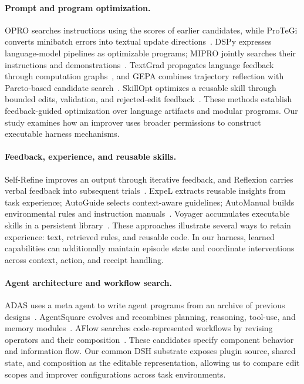 \documentclass[letterpaper]{article}
\begin{document}
\paragraph{Prompt and program optimization.}
OPRO searches instructions using the scores of earlier candidates, while ProTeGi converts minibatch errors into textual update directions~\citep{opro,protegi}. DSPy expresses language-model pipelines as optimizable programs; MIPRO jointly searches their instructions and demonstrations~\citep{dspy,mipro}. TextGrad propagates language feedback through computation graphs~\citep{textgrad}, and GEPA combines trajectory reflection with Pareto-based candidate search~\citep{gepa}. SkillOpt optimizes a reusable skill through bounded edits, validation, and rejected-edit feedback~\citep{skillopt}. These methods establish feedback-guided optimization over language artifacts and modular programs. Our study examines how an improver uses broader permissions to construct executable harness mechanisms.

\paragraph{Feedback, experience, and reusable skills.}
Self-Refine improves an output through iterative feedback, and Reflexion carries verbal feedback into subsequent trials~\citep{selfrefine,reflexion}. ExpeL extracts reusable insights from task experience; AutoGuide selects context-aware guidelines; AutoManual builds environmental rules and instruction manuals~\citep{expel,autoguide,automanual}. Voyager accumulates executable skills in a persistent library~\citep{voyager}. These approaches illustrate several ways to retain experience: text, retrieved rules, and reusable code. In our harness, learned capabilities can additionally maintain episode state and coordinate interventions across context, action, and receipt handling.

\paragraph{Agent architecture and workflow search.}
ADAS uses a meta agent to write agent programs from an archive of previous designs~\citep{adas}. AgentSquare evolves and recombines planning, reasoning, tool-use, and memory modules~\citep{agentsquare}. AFlow searches code-represented workflows by revising operators and their composition~\citep{aflow}. These candidates specify component behavior and information flow. Our common DSH substrate exposes plugin source, shared state, and composition as the editable representation, allowing us to compare edit scopes and improver configurations across task environments.
\end{document}

